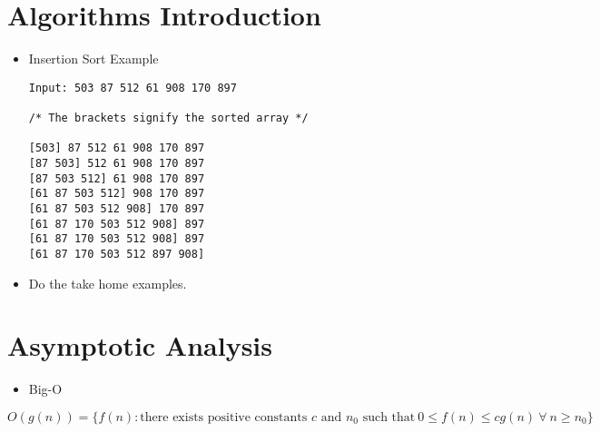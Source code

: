 \documentclass{article}
\begin{document}
\section{Algorithms Introduction}
\begin{itemize}
\item Insertion Sort Example

\begin{verbatim}
Input: 503 87 512 61 908 170 897

/* The brackets signify the sorted array */

[503] 87 512 61 908 170 897
[87 503] 512 61 908 170 897
[87 503 512] 61 908 170 897
[61 87 503 512] 908 170 897
[61 87 503 512 908] 170 897
[61 87 170 503 512 908] 897
[61 87 170 503 512 908] 897
[61 87 170 503 512 897 908]
\end{verbatim}

\item Do the take home examples.
\end{itemize}

\section{Asymptotic Analysis}
\begin{itemize}
\item Big-O
\end{itemize}

\begin{equation}
O(g(n)) = \{ f(n) : \text{there exists positive constants $c$ and $n_0$ such that} \ 0 \leq f(n) \leq cg(n) \ \forall \ n \geq n_0  \}
\end{equation}
\end{document}
